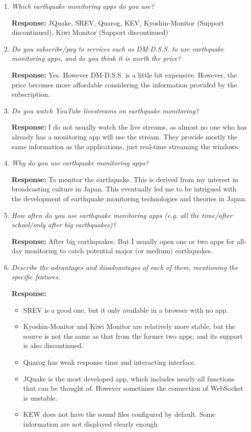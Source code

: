 \documentclass{article}
\begin{document}
\begin{enumerate}
    \item \textit{Which earthquake monitoring apps do you use?}
    
    \textbf{Response:} JQuake, SREV, Quarog, KEV, Kyoshin-Monitor (Support discontinued), Kiwi Monitor (Support discontinued)

    \item \textit{Do you subscribe/pay to services such as DM-D.S.S. to use earthquake monitoring apps, and do you think it is worth the price?}
    
    \textbf{Response:} Yes. However DM-D.S.S. is a little bit expensive. However, the price becomes more affordable considering the information provided by the subscription.

    \item \textit{Do you watch YouTube livestreams on earthquake monitoring?}
    
    \textbf{Response:} I do not usually watch the live streams, as almost no one who has already has a monitoring app will use the stream. They provide mostly the same information as the applications, just real-time streaming the windows.

    \item \textit{Why do you use earthquake monitoring apps?}
    
    \textbf{Response:} To monitor the earthquake. This is derived from my interest in broadcasting culture in Japan. This eventually led me to be intrigued with the development of earthquake monitoring technologies and theories in Japan.

    \item \textit{How often do you use earthquake monitoring apps (e.g. all the time/after school/only after big earthquakes)?}
    
    \textbf{Response:} After big earthquakes. But I usually open one or two apps for all-day monitoring to catch potential major (or medium) earthquakes.

    \item \textit{Describe the advantages and disadvantages of each of them, mentioning the specific features.}
    
    \textbf{Response:}
    \begin{itemize}
        \item SREV is a good one, but it only available in a browser with no app.
        \item Kyoshin-Monitor and Kiwi Monitor are relatively more stable, but the source is not the same as that from the former two apps, and its support is also discontinued.
        \item Quarog has weak response time and interacting interface.
        \item JQuake is the most developed app, which includes nearly all functions that can be thought of. However sometimes the connection of WebSocket is unstable.
        \item KEW does not have the sound files configured by default. Some information are not displayed clearly enough.
    \end{itemize}
    

\end{enumerate}
\end{document}
